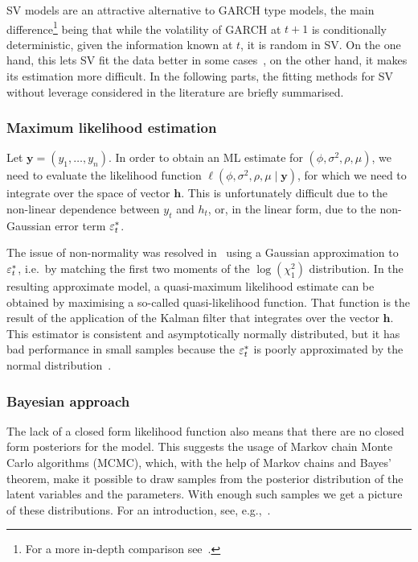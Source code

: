 SV models are an attractive alternative to GARCH type models, the main difference\footnote{For a more in-depth comparison see~\citet{Harvey1994}.} being that while the volatility of GARCH at $t+1$ is conditionally deterministic, given the information known at $t$, it is random in SV.
On the one hand, this lets SV fit the data better in some cases~\citep{Kim1998,kastner2016dealing,Chan2016}, on the other hand, it makes its estimation more difficult. In the following parts, the fitting methods for SV without leverage considered in the literature are briefly summarised.

\subsubsection{Maximum likelihood estimation}

Let $\bm{y}=(y_1,\dots,y_n)$.
In order to obtain an ML estimate for $(\phi,\sigma^2,\rho,\mu)$, we need to evaluate the likelihood function $\ell(\phi,\sigma^2,\rho,\mu\mid\bm{y})$, for which we need to integrate over the space of vector $\bm{h}$.
This is unfortunately difficult due to the non-linear dependence between $y_t$ and $h_t$, or, in the linear form, due to the non-Gaussian error term $\varepsilon_t^\ast$.

The issue of non-normality was resolved in~\citet{Harvey1994} using a Gaussian approximation to $\varepsilon_t^\ast$, i.e.\ by matching the first two moments of the $\log(\chi_1^2)$ distribution.
In the resulting approximate model, a quasi-maximum likelihood estimate can be obtained by maximising a so-called quasi-likelihood function.
That function is the result of the application of the Kalman filter that integrates over the vector $\bm{h}$.
This estimator is consistent and asymptotically normally distributed, but it has bad performance in small samples because the $\varepsilon_t^\ast$ is poorly approximated by the normal distribution~\citep{Kim1998}.

\subsubsection{Bayesian approach}

The lack of a closed form likelihood function also means that there are no closed form posteriors for the model.
This suggests the usage of Markov chain Monte Carlo algorithms (MCMC), which, with the help of Markov chains and Bayes' theorem, make it possible to draw samples from the posterior distribution of the latent variables and the parameters.
With enough such samples we get a picture of these distributions.
For an introduction, see, e.g.,~\citet{Geyer2011}.

